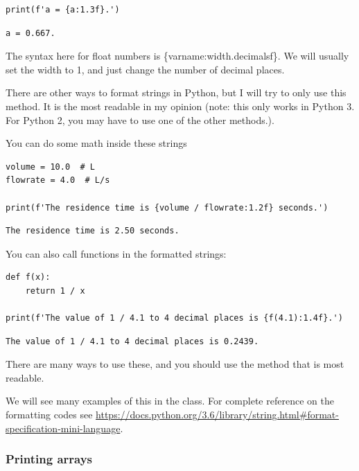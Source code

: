 \documentclass[11pt]{article}
\begin{document}
\begin{verbatim}
print(f'a = {a:1.3f}.')
\end{verbatim}

\begin{verbatim}
a = 0.667.

\end{verbatim}

The syntax here for float numbers is \{varname:width.decimalsf\}. We will usually set the width to 1, and just change the number of decimal places.

There are other ways to format strings in Python, but I will try to only use this method. It is the most readable in my opinion (note: this only works in Python 3. For Python 2, you may have to use one of the other methods.).

You can do some math inside these strings

\begin{verbatim}
volume = 10.0  # L
flowrate = 4.0  # L/s

print(f'The residence time is {volume / flowrate:1.2f} seconds.')
\end{verbatim}

\begin{verbatim}
The residence time is 2.50 seconds.

\end{verbatim}

You can also call functions in the formatted strings:

\begin{verbatim}
def f(x):
    return 1 / x

print(f'The value of 1 / 4.1 to 4 decimal places is {f(4.1):1.4f}.')
\end{verbatim}

\begin{verbatim}
The value of 1 / 4.1 to 4 decimal places is 0.2439.

\end{verbatim}

There are many ways to use these, and you should use the method that is most readable.

We will see many examples of this in the class. For complete reference on the formatting codes see \url{https://docs.python.org/3.6/library/string.html\#format-specification-mini-language}.

\subsubsection{Printing arrays}
\label{sec:orgfc7a496}
\end{document}
